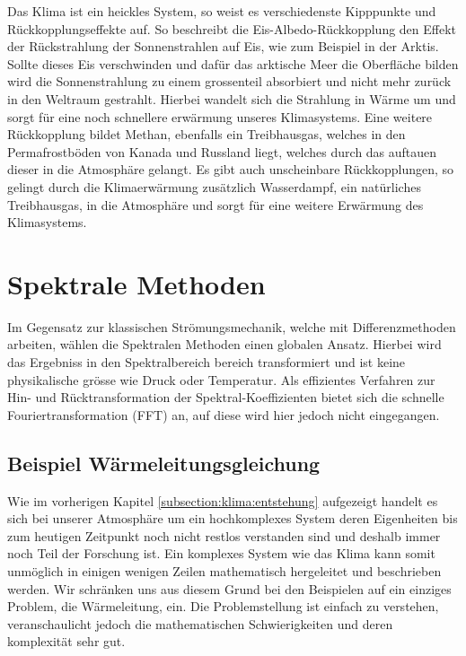 \begin{refsection}
Das Klima ist ein heickles System, so weist es verschiedenste Kipppunkte und Rückkopplungseffekte auf. So beschreibt die Eis-Albedo-Rückkopplung den Effekt der Rückstrahlung der Sonnenstrahlen auf Eis, wie zum Beispiel in der Arktis. Sollte dieses Eis verschwinden und dafür das arktische Meer die Oberfläche bilden wird die Sonnenstrahlung zu einem grossenteil absorbiert und nicht mehr zurück in den Weltraum gestrahlt. Hierbei wandelt sich die Strahlung in Wärme um und sorgt für eine noch schnellere erwärmung unseres Klimasystems. Eine weitere Rückkopplung bildet Methan, ebenfalls ein Treibhausgas, welches in den Permafrostböden von Kanada und Russland liegt, welches durch das auftauen dieser in die Atmosphäre gelangt. Es gibt auch unscheinbare Rückkopplungen, so gelingt durch die Klimaerwärmung zusätzlich Wasserdampf, ein natürliches Treibhausgas, in die Atmosphäre und sorgt für eine weitere Erwärmung des Klimasystems.


\section{Spektrale Methoden
\label{section:klima:spektrale}}
Im Gegensatz zur klassischen Strömungsmechanik, welche mit Differenzmethoden arbeiten, wählen die Spektralen Methoden einen globalen Ansatz. Hierbei wird das Ergebniss in den Spektralbereich bereich transformiert und ist keine physikalische grösse wie Druck oder Temperatur. Als effizientes Verfahren zur Hin- und Rücktransformation der Spektral-Koeffizienten bietet sich die schnelle Fouriertransformation (FFT) an, auf diese wird hier jedoch nicht eingegangen.


\subsection{Beispiel Wärmeleitungsgleichung}
Wie im vorherigen Kapitel \ref{subsection:klima:entstehung}  aufgezeigt handelt es sich bei unserer Atmosphäre um ein hochkomplexes System deren Eigenheiten bis zum heutigen Zeitpunkt noch nicht restlos verstanden sind und deshalb immer noch Teil der Forschung ist. Ein komplexes System wie das Klima kann somit unmöglich in einigen wenigen Zeilen mathematisch hergeleitet und beschrieben werden. Wir schränken uns aus diesem Grund bei den Beispielen auf ein einziges Problem, die Wärmeleitung, ein. Die Problemstellung ist einfach zu verstehen, veranschaulicht jedoch die mathematischen Schwierigkeiten und deren komplexität sehr gut.


\end{refsection}
